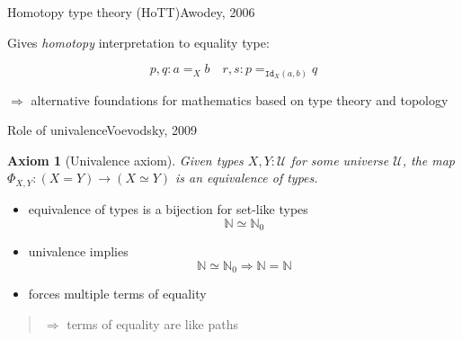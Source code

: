 \documentclass[english, draft]{beamer}
\newtheorem{axiom}[theorem]{Axiom}
\begin{document}
\begin{frame}{Homotopy type theory (HoTT)}{Awodey, 2006}

Gives \emph{homotopy} interpretation to equality type:

\centering
$$ p,q : a =_X b \quad r,s : p =_{\texttt{Id}_X(a,b)} q$$ 




$\Rightarrow$ alternative foundations for mathematics based on type theory and topology

\end{frame}






\begin{frame}{Role of univalence}{Voevodsky, 2009}

\begin{axiom}[Univalence axiom] 
 Given types $X,Y : \mathcal{U}$ for some universe $\mathcal{U}$, the map \(\Phi_{X,Y}: (X=Y) \rightarrow (X \simeq Y)\) is an equivalence of types. 
\end{axiom}

\begin{itemize}
    \item equivalence of types is a bijection for set-like types \[\mathbb{N} \simeq \mathbb{N}_0 \]
    \item univalence implies \[\mathbb{N} \simeq \mathbb{N}_0 \Rightarrow \mathbb{N} = \mathbb{N}\]

    \item forces multiple terms of equality
\end{itemize}

\pause
\begin{quotation}
$\Rightarrow$ terms of equality are like paths
\end{quotation}



\end{frame}
\end{document}
